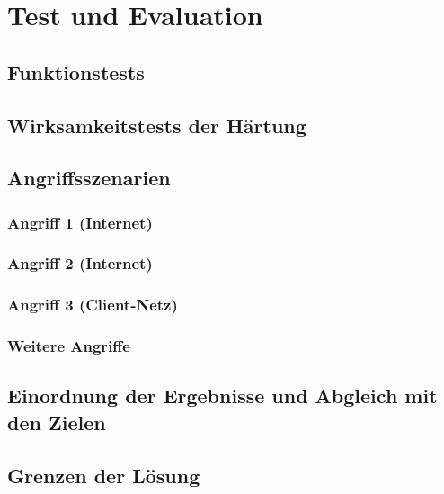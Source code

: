 \chapter{Test und Evaluation}\label{chap:test-und-evaluation}


\section{Funktionstests}\label{sec:funktionstests}


\section{Wirksamkeitstests der Härtung}\label{sec:wirksamkeitstests-der-haertung}


\section{Angriffsszenarien}\label{sec:angriffsszenarien}


\subsection{Angriff 1 (Internet)}\label{subsec:angriffsszenarien-angriff-1-internet}


\subsection{Angriff 2 (Internet)}\label{subsec:angriffsszenarien-angriff-2-internet}


\subsection{Angriff 3 (Client-Netz)}\label{subsec:angriffsszenarien-angriff-3-client-netz}


\subsection{Weitere Angriffe}\label{subsec:angriffsszenarien-weitere-angriffe}


\section{Einordnung der Ergebnisse und Abgleich mit den Zielen}\label{sec:einordnung-der-ergebnisse-und-abgleich-mit-den-zielen}


\section{Grenzen der Lösung}\label{sec:grenzen-der-loesung}

